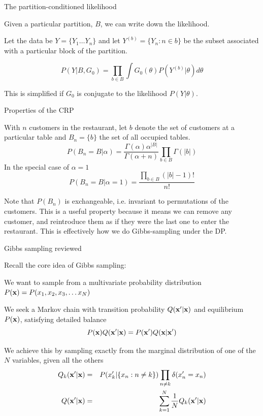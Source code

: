 \documentclass{beamer}
\begin{document}
\begin{frame}{The partition-conditioned likelihood}

Given a particular partition, $B$, we can write down the likelihood.

Let the data be $Y = \{ Y_1 \ldots Y_n \}$ and let $Y^{(b)} = \{ Y_n: n \in b \}$ be the subset associated with a particular block of the partition.

\[
P(Y|B,G_0) = \prod_{b \in B} \int G_0(\theta) P(Y^{(b)}|\theta) d\theta
\]

This is simplified if $G_0$ is conjugate to the likelihood $P(Y|\theta)$.

\end{frame}


\begin{frame}{Properties of the CRP}

With $n$ customers in the restaurant, let $b$ denote the set of customers at a particular table and $B_n = \{ b \}$ the set of all occupied tables.
\[
P(B_n = B|\alpha) = \frac{\Gamma(\alpha) \alpha^{|B|}}{\Gamma(\alpha+n)} \prod_{b \in B} \Gamma(|b|)
\]
In the special case of $\alpha=1$
\[
P(B_n = B|\alpha = 1) = \frac{\prod_{b \in B} (|b|-1)!}{n!}
\]

Note that $P(B_n)$ is \alert{exchangeable}, i.e. invariant to permutations of the customers.
This is a useful property because it means we can remove any customer, and reintroduce them as if they were the last one to enter the restaurant.
This is effectively how we do Gibbs-sampling under the DP.

\end{frame}


\begin{frame}{Gibbs sampling reviewed}

Recall the core idea of Gibbs sampling:
\itemb
\item We want to sample from a multivariate probability distribution $P({\bf x}) = P(x_1,x_2,x_3,\ldots x_N)$
\item We seek a Markov chain with transition probability $Q({\bf x}'|{\bf x})$ and equilibrium $P({\bf x})$, satisfying \alert{detailed balance}
\[
P({\bf x}) Q({\bf x}'|{\bf x}) = P({\bf x}') Q({\bf x}|{\bf x}')
\]
\item We achieve this by sampling exactly from the marginal distribution of one of the $N$ variables, given all the others
\begin{eqnarray*}
Q_k({\bf x}'|{\bf x}) & = & P(x'_k | \{ x_n : n \neq k \}) \prod_{n \neq k} \delta(x'_n = x_n) \\
Q({\bf x}'|{\bf x}) & = & \sum_{k=1}^N \frac{1}{N} Q_k({\bf x}'|{\bf x})
\end{eqnarray*}
\iteme

\end{frame}
\end{document}
